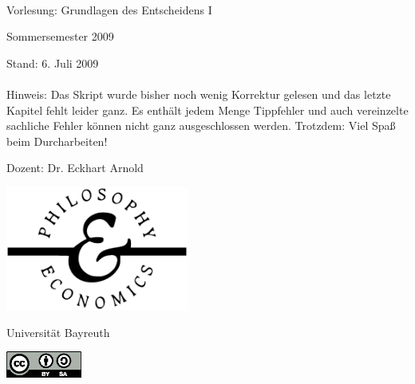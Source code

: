 \documentclass[12pt, a4paper, german]{book}
\numberwithin {equation}{section}
\begin{document}



\begin{titlepage}
\begin{center}

\ { } 

\vspace{0.5cm}

{\Large Vorlesung: Grundlagen des Entscheidens I}

\vspace{0.75cm}

Sommersemester 2009

\vspace{0.5cm}

Stand: 6. Juli 2009 \\~\\
Hinweis: Das Skript wurde bisher noch wenig Korrektur gelesen und das letzte Kapitel
fehlt leider ganz. Es enthält jedem Menge Tippfehler und auch vereinzelte sachliche Fehler
können nicht ganz ausgeschlossen werden. Trotzdem: Viel Spaß beim Durcharbeiten!

\vspace{0.5cm}

Dozent: Dr. Eckhart Arnold

\vspace{1cm}

\includegraphics[width=6cm]{Grafiken/pe_logo.eps}

\vspace{0.25cm}

{\Large Universität Bayreuth}

\vspace{1.75cm}

\includegraphics[width=2.5cm]{Grafiken/CC-BY-SA.eps}


\end{center}
\end{titlepage}
\end{document}
